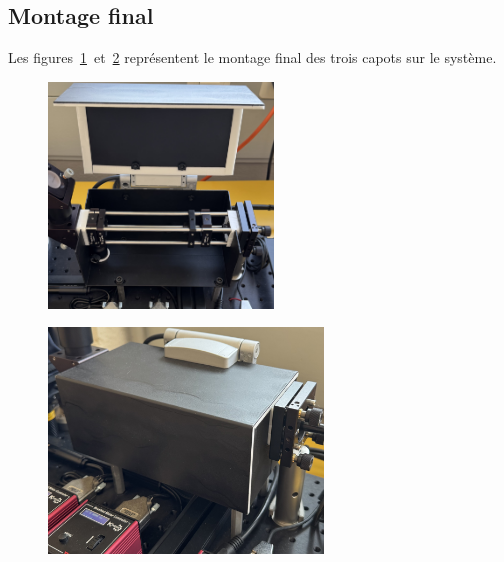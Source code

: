 \begin{minipage}{\textwidth}
    \subsection{Montage final} \label{montage_final}
    Les figures~\ref{montage_alu_ouvert}~et~\ref{montage_alu_ferme} représentent le montage final des trois capots sur le système.
    \vspace{1em}

    \begin{minipage}[c]{0.48\textwidth}
        \begin{figure}[H]
            \begin{center}
                \includegraphics[height=6cm]{assets/figures/Protections_laser/Securite_mecanique/Protection_entree_laser/montage_alu_ouvert.jpeg}
            \end{center}
            \label{montage_alu_ouvert}
        \end{figure}
    \end{minipage}
    \begin{minipage}[r]{0.48\textwidth}
        \begin{figure}[H]
            \begin{center}
                \includegraphics[height=6cm]{assets/figures/Protections_laser/Securite_mecanique/Protection_entree_laser/montage_alu_ferme.jpeg}
            \end{center}
            \label{montage_alu_ferme}
        \end{figure}
    \end{minipage}
\end{minipage}

